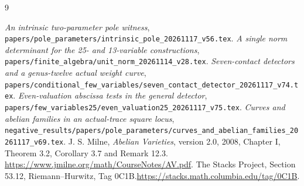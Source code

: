 \documentclass[11pt,a4paper]{article}
\begin{document}
\begin{thebibliography}{9}\raggedright
{}\emph{An intrinsic two-parameter pole witness},
\nolinkurl{papers/pole_parameters/intrinsic_pole_20261117_v56.tex}.
\emph{A single norm determinant for the 25- and 13-variable constructions},
\nolinkurl{papers/finite_algebra/unit_norm_20261114_v28.tex}.
\emph{Seven-contact detectors and a genus-twelve actual weight curve},
\nolinkurl{papers/conditional_few_variables/seven_contact_detector_20261117_v74.tex}.
\emph{Even-valuation abscissa tests in the general detector},
\nolinkurl{papers/few_variables25/even_valuation25_20261117_v75.tex}.
\emph{Curves and abelian families in an actual-trace square locus},
\nolinkurl{negative_results/papers/pole_parameters/curves_and_abelian_families_20261117_v69.tex}.
J. S. Milne, \emph{Abelian Varieties}, version 2.0,
2008, Chapter I, Theorem 3.2, Corollary 3.7 and Remark 12.3.
\url{https://www.jmilne.org/math/CourseNotes/AV.pdf}.
The Stacks Project, Section 53.12, Riemann--Hurwitz,
Tag 0C1B.\quad\url{https://stacks.math.columbia.edu/tag/0C1B}.
\end{thebibliography}
\end{document}
